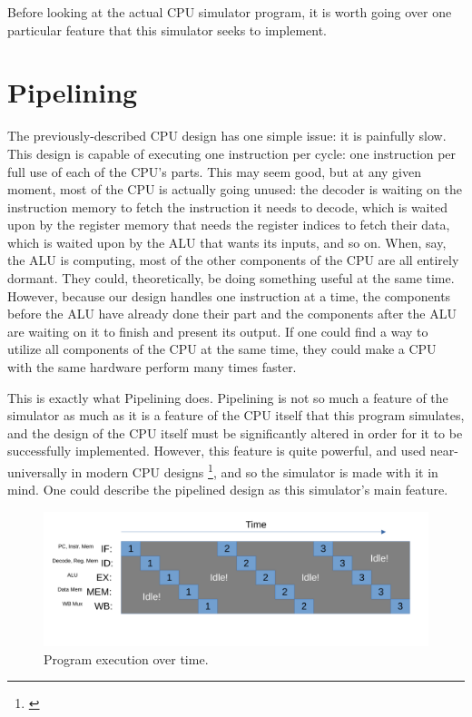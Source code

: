 \documentclass[12pt,twoside]{reedthesis}
\begin{document}
Before looking at the actual CPU simulator program, it is worth going over one particular feature that this simulator seeks to implement.

\section{Pipelining}


The previously-described CPU design has one simple issue: it is painfully slow. This design is capable of executing one instruction per cycle: one instruction per full use of each of the CPU's parts. This may seem good, but at any given moment, most of the CPU is actually going unused: the decoder is waiting on the instruction memory to fetch the instruction it needs to decode, which is waited upon by the register memory that needs the register indices to fetch their data, which is waited upon by the ALU that wants its inputs, and so on.
When, say, the ALU is computing, most of the other components of the CPU are all entirely dormant. They could, theoretically, be doing something useful at the same time. However, because our design handles one instruction at a time, the components before the ALU have already done their part and the components after the ALU are waiting on it to finish and present its output. If one could find a way to utilize all components of the CPU at the same time, they could make a CPU with the same hardware perform many times faster.

This is exactly what Pipelining does. Pipelining is not so much a feature of the simulator as much as it is a feature of the CPU itself that this program simulates, and the design of the CPU itself must be significantly altered in order for it to be successfully implemented.
However, this feature is quite powerful, and used near-universally in modern CPU designs \footnote{\cite{denning}}, and so the simulator is made with it in mind. One could describe the pipelined design as this simulator's main feature.


\begin{figure}[h!]

	\centering
	\includegraphics[scale=0.6]{wastedsteps}
	\caption{Program execution over time.}
	\label{wasted-steps}
\end{figure}
\end{document}
